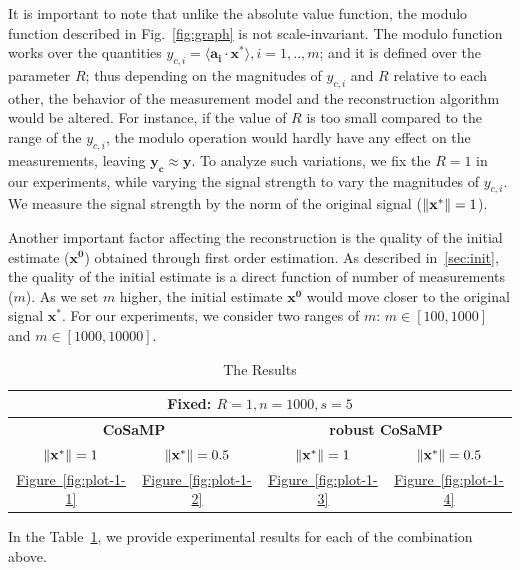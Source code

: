 It is important to note that unlike the absolute value function, the modulo function described in Fig.~\ref{fig:graph} is not scale-invariant. The modulo function works over the quantities $y_{c,i}=\langle \mathbf{a_i} \cdot \mathbf{x^*} \rangle, i=1,..,m$; and it is defined over the parameter $R$; thus depending on the magnitudes of $y_{c,i}$ and $R$ relative to each other, the behavior of the measurement model and the reconstruction algorithm would be altered. For instance, if the value of $R$ is too small compared to the range of the $y_{c,i}$, the modulo operation would hardly have any effect on the measurements, leaving $\mathbf{y_c \approx y}$. To analyze such variations, we fix the $R =1$ in our experiments, while varying the signal strength to vary the magnitudes of $y_{c,i}$. We measure the signal strength by the norm of the original signal ($\|\mathbf{{x}^*}\|=1$).

Another important factor affecting the reconstruction is the quality of the initial estimate ($\mathbf{{x}^0}$) obtained through first order estimation. As described in~\ref{sec:init}, the quality of the initial estimate is a direct function of number of measurements ($m$). As we set $m$ higher, the initial estimate $\mathbf{{x}^0}$ would move closer to the original signal $\mathbf{{x}^*}$. For our experiments, we consider two ranges of $m$: $m \in [100,1000]$ and $m \in [1000,10000]$.
\begin{center}
	\begin{table}
		\centering
		\begin{tabular}{cccc}\toprule
			\multicolumn{4}{c}{\small{\textbf{Fixed:} $R=1, n=1000, s=5$}} \\ \midrule
			\multicolumn{2}{c}{\textbf{CoSaMP}}&\multicolumn{2}{c}{\textbf{robust CoSaMP}}
			\\\cmidrule(r){1-2}\cmidrule(r){3-4}  
			\small{$\|\mathbf{{x}^*}\|=1$}&\small{$\|\mathbf{{x}^*}\|=0.5$}&\small{$\|\mathbf{{x}^*}\|=1$}&\small{$\|\mathbf{{x}^*}\|=0.5$}\\\midrule
			\hyperref[fig:plot-1-1]{Figure~\ref{fig:plot-1-1}} & \hyperref[fig:plot-1-2]{Figure~\ref{fig:plot-1-2}}
			& \hyperref[fig:plot-1-3]{Figure~\ref{fig:plot-1-3}}  & \hyperref[fig:plot-1-4]{Figure~\ref{fig:plot-1-4}} \\
			\bottomrule
		\end{tabular}
		\caption{The Results}\label{Tab2}
	\end{table} 	
\end{center}
In the Table~\ref{Tab2}, we provide experimental results for each of the combination above.

